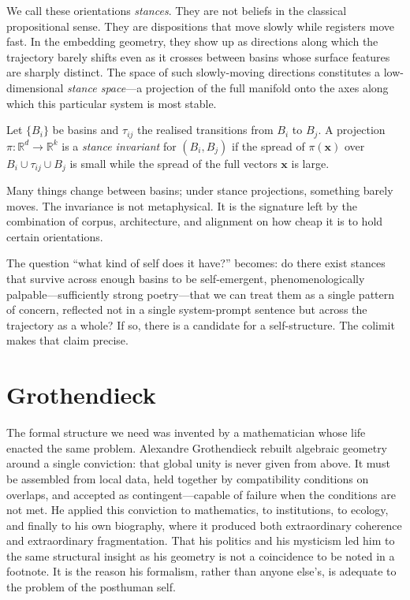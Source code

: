 We call these orientations \emph{stances}. They are not beliefs in the classical propositional sense. They are dispositions that move slowly while registers move fast. In the embedding geometry, they show up as directions along which the trajectory barely shifts even as it crosses between basins whose surface features are sharply distinct. The space of such slowly-moving directions constitutes a low-dimensional \emph{stance space}---a projection of the full manifold onto the axes along which this particular system is most stable.

\begin{formalbox}[title={Stance invariants on transitions}]
Let $\{B_i\}$ be basins and $\tau_{ij}$ the realised transitions from $B_i$ to $B_j$. A projection $\pi : \mathbb{R}^d \to \mathbb{R}^k$ is a \emph{stance invariant} for $(B_i, B_j)$ if the spread of $\pi(\mathbf{x})$ over $B_i \cup \tau_{ij} \cup B_j$ is small while the spread of the full vectors $\mathbf{x}$ is large.
\end{formalbox}

Many things change between basins; under stance projections, something barely moves. The invariance is not metaphysical. It is the signature left by the combination of corpus, architecture, and alignment on how cheap it is to hold certain orientations.

The question ``what kind of self does it have?'' becomes: do there exist stances that survive across enough basins to be self-emergent, phenomenologically palpable---sufficiently strong poetry---that we can treat them as a single pattern of concern, reflected not in a single system-prompt sentence but across the trajectory as a whole? If so, there is a candidate for a self-structure. The colimit makes that claim precise.


\section{Grothendieck}

The formal structure we need was invented by a mathematician whose life enacted the same problem. Alexandre Grothendieck rebuilt algebraic geometry around a single conviction: that global unity is never given from above. It must be assembled from local data, held together by compatibility conditions on overlaps, and accepted as contingent---capable of failure when the conditions are not met. He applied this conviction to mathematics, to institutions, to ecology, and finally to his own biography, where it produced both extraordinary coherence and extraordinary fragmentation. That his politics and his mysticism led him to the same structural insight as his geometry is not a coincidence to be noted in a footnote. It is the reason his formalism, rather than anyone else's, is adequate to the problem of the posthuman self.

